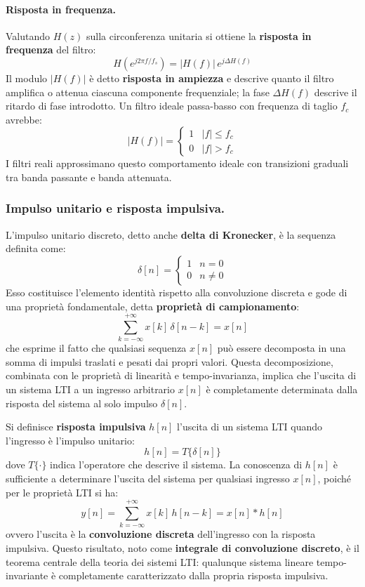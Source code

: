 \paragraph{Risposta in frequenza.}
Valutando $H(z)$ sulla circonferenza unitaria si ottiene la \textbf{risposta in frequenza} del filtro:
\[
H\!\left(e^{j2\pi f/f_s}\right) = |H(f)|\, e^{j\Delta H(f)}
\]
Il modulo $|H(f)|$ è detto \textbf{risposta in ampiezza} e descrive quanto il filtro amplifica o attenua ciascuna componente frequenziale; la fase $\Delta H(f)$ descrive il ritardo di fase introdotto. Un filtro ideale passa-basso con frequenza di taglio $f_c$ avrebbe:
\[
|H(f)| = \begin{cases} 1 & |f| \leq f_c \\ 0 & |f| > f_c
\end{cases}
\]
I filtri reali approssimano questo comportamento ideale con transizioni graduali tra banda passante e banda attenuata.

\subsubsection{Impulso unitario e risposta impulsiva.}
L'impulso unitario discreto, detto anche \textbf{delta di Kronecker}, è la sequenza definita come:
\[
\delta[n] = \begin{cases} 1 & n = 0 \\ 0 & n \neq 0 \end{cases}
\]
Esso costituisce l'elemento identità rispetto alla convoluzione discreta e gode di una proprietà fondamentale, detta \textbf{proprietà di campionamento}:
\[
\sum_{k=-\infty}^{+\infty} x[k]\, \delta[n - k] = x[n]
\]
che esprime il fatto che qualsiasi sequenza $x[n]$ può essere decomposta in una somma di impulsi traslati e pesati dai propri valori. Questa decomposizione, combinata con le proprietà di linearità e tempo-invarianza, implica che l'uscita di un sistema LTI a un ingresso arbitrario $x[n]$ è completamente determinata dalla risposta del sistema al solo impulso $\delta[n]$.

Si definisce \textbf{risposta impulsiva} $h[n]$ l'uscita di un sistema LTI quando l'ingresso è l'impulso unitario:
\[
h[n] = T\{\delta[n]\}
\]
dove $T\{\cdot\}$ indica l'operatore che descrive il sistema. La conoscenza di $h[n]$ è sufficiente a determinare l'uscita del sistema per qualsiasi ingresso $x[n]$, poiché per le proprietà LTI si ha:
\[
y[n] = \sum_{k=-\infty}^{+\infty} x[k]\, h[n-k] = x[n] * h[n]
\]
ovvero l'uscita è la \textbf{convoluzione discreta} dell'ingresso con la risposta impulsiva. Questo risultato, noto come \textbf{integrale di convoluzione discreto}, è il teorema centrale della teoria dei sistemi LTI: qualunque sistema lineare tempo-invariante è completamente caratterizzato dalla propria risposta impulsiva.


